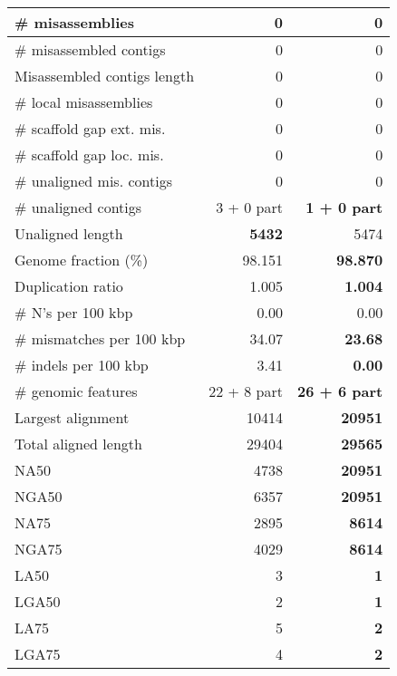 \documentclass[12pt,a4paper]{article}
\begin{document}
\begin{table}[ht]
\begin{center}
\begin{tabular}{|l*{2}{|r}|}
\# misassemblies & 0 & 0 \\ \hline
\# misassembled contigs & 0 & 0 \\ \hline
Misassembled contigs length & 0 & 0 \\ \hline
\# local misassemblies & 0 & 0 \\ \hline
\# scaffold gap ext. mis. & 0 & 0 \\ \hline
\# scaffold gap loc. mis. & 0 & 0 \\ \hline
\# unaligned mis. contigs & 0 & 0 \\ \hline
\# unaligned contigs & 3 + 0 part & {\bf 1 + 0 part} \\ \hline
Unaligned length & {\bf 5432} & 5474 \\ \hline
Genome fraction (\%) & 98.151 & {\bf 98.870} \\ \hline
Duplication ratio & 1.005 & {\bf 1.004} \\ \hline
\# N's per 100 kbp & 0.00 & 0.00 \\ \hline
\# mismatches per 100 kbp & 34.07 & {\bf 23.68} \\ \hline
\# indels per 100 kbp & 3.41 & {\bf 0.00} \\ \hline
\# genomic features & 22 + 8 part & {\bf 26 + 6 part} \\ \hline
Largest alignment & 10414 & {\bf 20951} \\ \hline
Total aligned length & 29404 & {\bf 29565} \\ \hline
NA50 & 4738 & {\bf 20951} \\ \hline
NGA50 & 6357 & {\bf 20951} \\ \hline
NA75 & 2895 & {\bf 8614} \\ \hline
NGA75 & 4029 & {\bf 8614} \\ \hline
LA50 & 3 & {\bf 1} \\ \hline
LGA50 & 2 & {\bf 1} \\ \hline
LA75 & 5 & {\bf 2} \\ \hline
LGA75 & 4 & {\bf 2} \\ \hline
\end{tabular}
\end{center}
\end{table}
\end{document}
